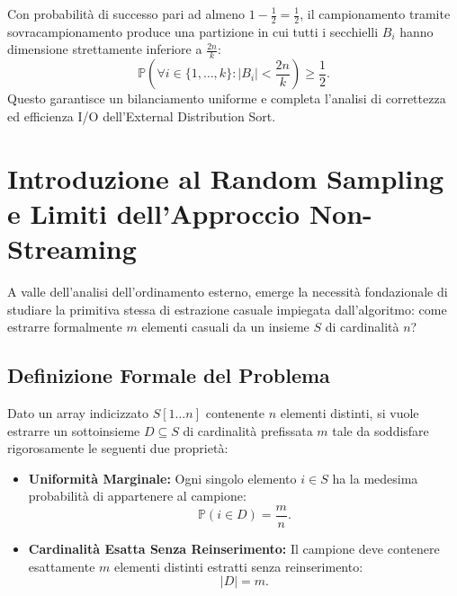 \begin{theorem}
Con probabilità di successo pari ad almeno $1 - \frac{1}{2} = \frac{1}{2}$, il campionamento tramite sovracampionamento produce una partizione in cui tutti i secchielli $B_i$ hanno dimensione strettamente inferiore a $\frac{2n}{k}$:
\begin{equation}
  \mathbb{P}\left(\forall i \in \{1, \dots, k\} \colon |B_i| < \frac{2n}{k}\right) \ge \frac{1}{2}.
\end{equation}
Questo garantisce un bilanciamento uniforme e completa l'analisi di correttezza ed efficienza I/O dell'External Distribution Sort. \qedhere
\end{theorem}

\FloatBarrier
\section{Introduzione al Random Sampling e Limiti dell'Approccio Non-Streaming}
\label{sec:intro-random-sampling-non-streaming}

A valle dell'analisi dell'ordinamento esterno, emerge la necessità fondazionale di studiare la primitiva stessa di estrazione casuale impiegata dall'algoritmo: come estrarre formalmente $m$ elementi casuali da un insieme $S$ di cardinalità $n$?

\subsection{Definizione Formale del Problema}
Dato un array indicizzato $S[1 \dots n]$ contenente $n$ elementi distinti, si vuole estrarre un sottoinsieme $D \subseteq S$ di cardinalità prefissata $m$ tale da soddisfare rigorosamente le seguenti due proprietà:
\begin{itemize}
  \item \textbf{Uniformità Marginale:} Ogni singolo elemento $i \in S$ ha la medesima probabilità di appartenere al campione:
  \begin{equation}
    \mathbb{P}(i \in D) = \frac{m}{n}.
  \end{equation}
  \item \textbf{Cardinalità Esatta Senza Reinserimento:} Il campione deve contenere esattamente $m$ elementi distinti estratti senza reinserimento:
  \begin{equation}
    |D| = m.
  \end{equation}
\end{itemize}

